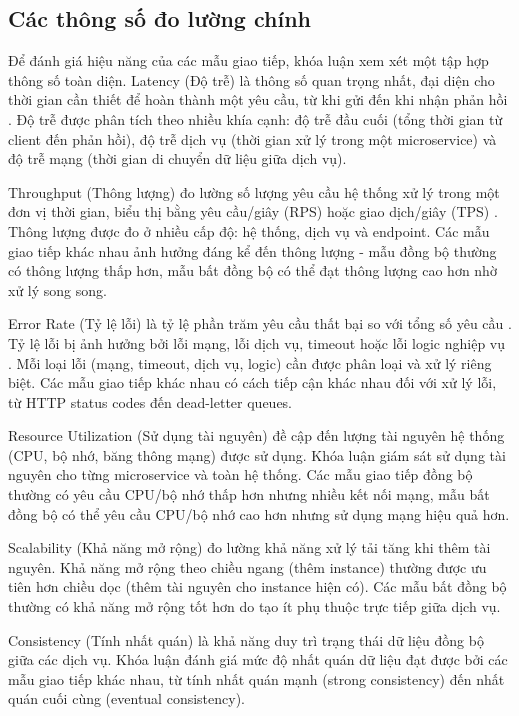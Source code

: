 \subsection{Các thông số đo lường chính}
Để đánh giá hiệu năng của các mẫu giao tiếp, khóa luận xem xét một tập hợp thông số toàn diện. Latency (Độ trễ) là thông số quan trọng nhất, đại diện cho thời gian cần thiết để hoàn thành một yêu cầu, từ khi gửi đến khi nhận phản hồi \cite{jun2018}. Độ trễ được phân tích theo nhiều khía cạnh: độ trễ đầu cuối (tổng thời gian từ client đến phản hồi), độ trễ dịch vụ (thời gian xử lý trong một microservice) và độ trễ mạng (thời gian di chuyển dữ liệu giữa dịch vụ).

Throughput (Thông lượng) đo lường số lượng yêu cầu hệ thống xử lý trong một đơn vị thời gian, biểu thị bằng yêu cầu/giây (RPS) hoặc giao dịch/giây (TPS) \cite{jun2018}. Thông lượng được đo ở nhiều cấp độ: hệ thống, dịch vụ và endpoint. Các mẫu giao tiếp khác nhau ảnh hưởng đáng kể đến thông lượng - mẫu đồng bộ thường có thông lượng thấp hơn, mẫu bất đồng bộ có thể đạt thông lượng cao hơn nhờ xử lý song song.

Error Rate (Tỷ lệ lỗi) là tỷ lệ phần trăm yêu cầu thất bại so với tổng số yêu cầu \cite{newman2015}. Tỷ lệ lỗi bị ảnh hưởng bởi lỗi mạng, lỗi dịch vụ, timeout hoặc lỗi logic nghiệp vụ \cite{richardson2019}. Mỗi loại lỗi (mạng, timeout, dịch vụ, logic) cần được phân loại và xử lý riêng biệt. Các mẫu giao tiếp khác nhau có cách tiếp cận khác nhau đối với xử lý lỗi, từ HTTP status codes đến dead-letter queues.

Resource Utilization (Sử dụng tài nguyên) đề cập đến lượng tài nguyên hệ thống (CPU, bộ nhớ, băng thông mạng) được sử dụng. Khóa luận giám sát sử dụng tài nguyên cho từng microservice và toàn hệ thống. Các mẫu giao tiếp đồng bộ thường có yêu cầu CPU/bộ nhớ thấp hơn nhưng nhiều kết nối mạng, mẫu bất đồng bộ có thể yêu cầu CPU/bộ nhớ cao hơn nhưng sử dụng mạng hiệu quả hơn.

Scalability (Khả năng mở rộng) đo lường khả năng xử lý tải tăng khi thêm tài nguyên. Khả năng mở rộng theo chiều ngang (thêm instance) thường được ưu tiên hơn chiều dọc (thêm tài nguyên cho instance hiện có). Các mẫu bất đồng bộ thường có khả năng mở rộng tốt hơn do tạo ít phụ thuộc trực tiếp giữa dịch vụ.

Consistency (Tính nhất quán) là khả năng duy trì trạng thái dữ liệu đồng bộ giữa các dịch vụ. Khóa luận đánh giá mức độ nhất quán dữ liệu đạt được bởi các mẫu giao tiếp khác nhau, từ tính nhất quán mạnh (strong consistency) đến nhất quán cuối cùng (eventual consistency).

